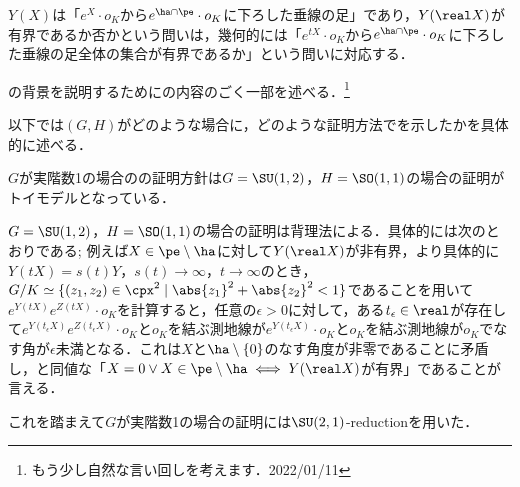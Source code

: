 \documentclass[12pt,dvipdfmx,uplatex]{jsarticle}
\begin{document}
$Y(X)$は「$e^{X}\cdot o_K$から$e^{\ha\cap\pe}\cdot o_K $に下ろした垂線の足」であり，$Y(\real X) $が有界であるか否かという問いは，幾何的には「$e^{tX}\cdot o_K$から$e^{\ha\cap\pe}\cdot o_K $に下ろした垂線の足全体の集合が有界であるか」という問いに対応する．

の背景を説明するために\cite{ber88}の内容のごく一部を述べる．\footnote{もう少し自然な言い回しを考えます．2022/01/11}


以下では$(G,H) $がどのような場合に，どのような証明方法でを示したかを具体的に述べる．

$G$が実階数1の場合のの証明方針は$G = \SU(1,2) $，$H= \SO(1,1)$の場合の証明がトイモデルとなっている．

$G = \SU(1,2) $，$H= \SO(1,1)$の場合の証明は背理法による．具体的には次のとおりである; 例えば$X\in \pe\setminus\ha $に対して$Y(\real X) $が非有界，より具体的に$Y(t X) = s(t) Y$，$s(t) \to \infty$，$t\to \infty $のとき，$G/K \simeq \{(z_1,z_2)\in \cpx^2 \mid \abs{z_1}^2 + \abs{z_2}^2 < 1 \} $であることを用いて$e^{Y(tX)}e^{Z(tX)}\cdot o_K $を計算すると，任意の$\epsilon > 0$に対して，ある$t_{\epsilon}\in \real$が存在して$ e^{Y(t_{\epsilon} X)}e^{Z(t_{\epsilon} X)}\cdot o_K $と$o_K$を結ぶ測地線が$e^{Y(t_{\epsilon} X)}\cdot o_K $と$o_K$を結ぶ測地線が$o_K$でなす角が$\epsilon $未満となる．これは$X$と$\ha\setminus\{0\} $のなす角度が非零であることに矛盾し，と同値な「$X = 0 \lor X\in \pe\setminus\ha \iff Y(\real X) $が有界」であることが言える．

これを踏まえて$G$が実階数1の場合の証明には$\SU(2,1) $-reductionを用いた．
\end{document}
